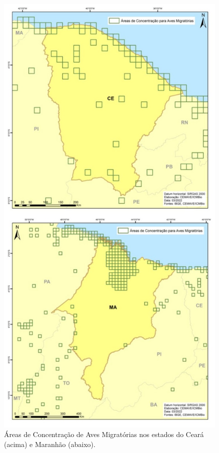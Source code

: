 \documentclass[
  oneside]{scrbook}
\begin{document}
\begin{figure}[H]

{\centering \includegraphics[width=0.7\linewidth]{imagens/cap07/Fig_12_CE_MA} 

}

\caption{Áreas de Concentração de Aves Migratórias nos estados do Ceará (acima) e Maranhão (abaixo).}\label{fig:32}
\end{figure}
\end{document}
